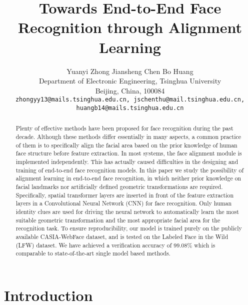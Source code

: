 \documentclass[10pt,twocolumn,letterpaper]{article}
\begin{document}
\setlength{\textfloatsep}{8pt plus 1.0pt minus 2.0pt}
\setlength{\abovecaptionskip}{1mm}
\setlength{\belowcaptionskip}{1mm}
\setlength{\abovedisplayskip}{1pt plus 2pt minus 6pt}
\title{Towards End-to-End Face Recognition through Alignment Learning}

\author{Yuanyi Zhong \qquad Jiansheng Chen \qquad Bo Huang \\
Department of Electronic Engineering, Tsinghua University\\
Beijing, China, 100084\\
{\tt\small zhongyy13@mails.tsinghua.edu.cn, jschenthu@mail.tsinghua.edu.cn, huangb14@mails.tsinghua.edu.cn}
}

\maketitle

\begin{abstract}

Plenty of effective methods have been proposed for face recognition during the past decade. Although these methods differ essentially in many aspects, a common practice of them is to specifically align the facial area based on the prior knowledge of human face structure before feature extraction. In most systems, the face alignment module is implemented independently. This has actually caused difficulties in the designing and training of end-to-end face recognition models. In this paper we study the possibility of alignment learning in end-to-end face recognition, in which neither prior knowledge on facial landmarks nor artificially defined geometric transformations are required. Specifically, spatial transformer layers are inserted in front of the feature extraction layers in a Convolutional Neural Network (CNN) for face recognition.  Only human identity clues are used for driving the neural network to automatically learn the most suitable geometric transformation and the most appropriate facial area for the recognition task. To ensure reproducibility, our model is trained purely on the publicly available CASIA-WebFace dataset, and is tested on the Labeled Face in the Wild (LFW) dataset. We have achieved a verification accuracy of 99.08\% which is comparable to state-of-the-art single model based methods. 

\end{abstract}

\section{Introduction}
\end{document}
